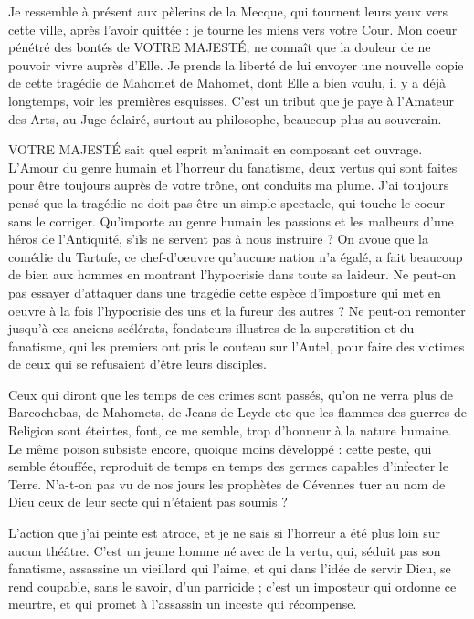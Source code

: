 \documentclass[french,twoside]{book} %
\newcommand{\salute}[1]{\bigbreak{#1}\par\medbreak}
\begin{document}
\salute{SIRE,}
\noindent Je ressemble à présent aux pèlerins de la Mecque, qui tournent leurs yeux vers cette ville, après l’avoir quittée : je tourne les miens vers votre Cour. Mon coeur pénétré des bontés de VOTRE MAJESTÉ, ne connaît que la douleur de ne pouvoir vivre auprès d’Elle. Je prends la liberté de lui envoyer une nouvelle copie de cette tragédie de Mahomet de Mahomet, dont Elle a bien voulu, il y a déjà longtemps, voir les premières esquisses. C’est un tribut que je paye à l’Amateur des Arts, au Juge éclairé, surtout au philosophe, beaucoup plus au souverain.\par
VOTRE MAJESTÉ sait quel esprit m’animait en composant cet ouvrage. L’Amour du genre humain et l’horreur du fanatisme, deux vertus qui sont faites pour être toujours auprès de votre trône, ont conduits ma plume. J’ai toujours pensé que la tragédie ne doit pas être un simple spectacle, qui touche le coeur sans le corriger. Qu’importe au genre humain les passions et les malheurs d’une héros de l’Antiquité, s’ils ne servent pas à nous instruire ? On avoue que la comédie du Tartufe, ce chef-d’oeuvre qu’aucune nation n’a égalé, a fait beaucoup de bien aux hommes en montrant l’hypocrisie dans toute sa laideur. Ne peut-on pas essayer d’attaquer dans une tragédie cette espèce d’imposture qui met en oeuvre à la fois l’hypocrisie des uns et la fureur des autres ? Ne peut-on remonter jusqu’à ces anciens scélérats, fondateurs illustres de la superstition et du fanatisme, qui les premiers ont pris le couteau sur l’Autel, pour faire des victimes de ceux qui se refusaient d’être leurs disciples.\par
Ceux qui diront que les temps de ces crimes sont passés, qu’on ne verra plus de Barcochebas, de Mahomets, de Jeans de Leyde etc que les flammes des guerres de Religion sont éteintes, font, ce me semble, trop d’honneur à la nature humaine. Le même poison subsiste encore, quoique moins développé : cette peste, qui semble étouffée, reproduit de temps en temps des germes capables d’infecter le Terre. N’a-t-on pas vu de nos jours les prophètes de Cévennes tuer au nom de Dieu ceux de leur secte qui n’étaient pas soumis ?\par
L’action que j’ai peinte est atroce, et je ne sais si l’horreur a été plus loin sur aucun théâtre. C’est un jeune homme né avec de la vertu, qui, séduit pas son fanatisme, assassine un vieillard qui l’aime, et qui dans l’idée de servir Dieu, se rend coupable, sans le savoir, d’un parricide ; c’est un imposteur qui ordonne ce meurtre, et qui promet à l’assassin un inceste qui récompense.\par
\end{document}
